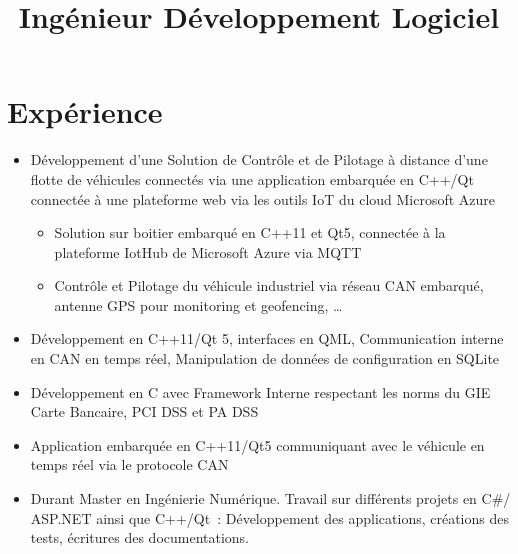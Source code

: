 \documentclass[11pt, a4paper]{moderncv}
\title{Ingénieur Développement Logiciel}
\begin{document}
\makecvtitle

\section{Expérience}
\begin{itemize}
  \item Développement d'une Solution de Contrôle et de Pilotage à distance d'une flotte de véhicules connectés via une application embarquée en C++/Qt connectée à une plateforme web via les outils IoT du cloud Microsoft Azure
  \begin{itemize}
    \item Solution sur boitier embarqué en C++11 et Qt5, connectée à la plateforme IotHub de Microsoft Azure via MQTT
    \item Contrôle et Pilotage du véhicule industriel via réseau CAN embarqué, antenne GPS pour monitoring et geofencing, \dots
  \end{itemize}
\end{itemize}
\medskip
{}
\begin{itemize}
  \item Développement en C++11/Qt 5, interfaces en QML, Communication interne en CAN en temps réel, Manipulation de données de configuration en SQLite
\end{itemize}
\medskip
{}
\begin{itemize}
  \item Développement en C avec Framework Interne respectant les norms du GIE Carte Bancaire, PCI DSS et PA DSS
\end{itemize}
\medskip
{}
\begin{itemize}
  \item Application embarquée en C++11/Qt5 communiquant avec le véhicule en temps réel via le protocole CAN 
\end{itemize}
\medskip
{}
\begin{itemize}
  \item Durant Master en Ingénierie Numérique. Travail sur différents projets en C\#/ ASP.NET ainsi que C++/Qt : Développement des applications, créations des tests, écritures des documentations.
\end{itemize}
\end{document}
